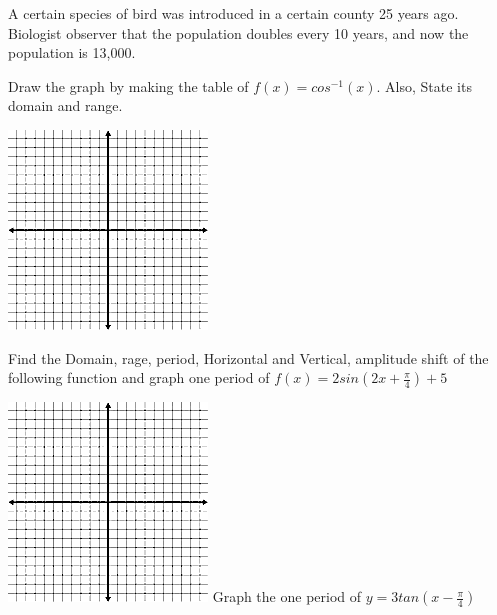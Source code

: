 \documentclass[11pt]{exam}
\begin{document}
\begin{questions}

\newpage
\vspace{8cm}
\addpoints
\question[10] A certain species of bird was introduced in a certain county 25 years ago. Biologist observer that the population doubles every 10 years, and now the population is 13,000.   

\vspace{9cm}
\addpoints
\question[10] Draw the graph by making the table of  $f(x)=cos^{-1}(x)$. Also, State its domain and range.
	\begin{center}
	\includegraphics{graph1.png}	
	\end{center}

\newpage
\addpoints
\question[10] Find the Domain, rage, period, Horizontal and Vertical, amplitude shift of the following function and  graph one period of $f(x)=2sin(2x+\frac{\pi}{4})+5$

\includegraphics{graph1.png}
\vspace{9cm}
\addpoints
\question[10] Graph the one period of $y=3tan(x-\frac{\pi}{4})$








\end{questions}
\end{document}
